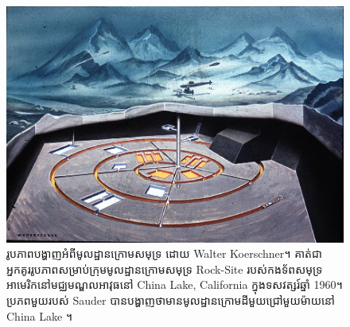 \documentclass[10pt,twocolumn,letterpaper]{article}
\begin{document}
\begin{figure}[t]
\begin{center}
   \includegraphics[width=1\linewidth]{undersea.jpg}
\end{center}
   \caption{រូបភាពបង្ហាញអំពីមូលដ្ឋានក្រោមសមុទ្រ ដោយ Walter Koerschner។ គាត់ជាអ្នកគូររូបភាពសម្រាប់ក្រុមមូលដ្ឋានក្រោមសមុទ្រ Rock-Site របស់កងទ័ពសមុទ្រអាមេរិកនៅមជ្ឈមណ្ឌលអាវុធនៅ China Lake, California ក្នុងទសវត្សរ៍ឆ្នាំ 1960។ ប្រភពមួយរបស់ Sauder បានបង្ហាញថាមានមូលដ្ឋានក្រោមដីមួយជ្រៅមួយម៉ាយនៅ China Lake \cite{22,23}។}
\label{fig:5}
\label{fig:onecol}
\end{figure}
\end{document}
